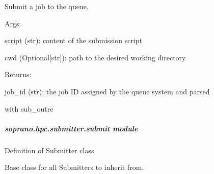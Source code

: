 \documentclass[letterpaper,10pt,english]{sphinxmanual}
\begin{document}
\begin{fulllineitems}
\begin{fulllineitems}
\end{fulllineitems}


\begin{fulllineitems}
\label{doctree/soprano.hpc.submitter.queues:soprano.hpc.submitter.queues.QueueInterface.submit}
Submit a job to the queue.

\begin{DUlineblock}{0em}
\item[] Args:
\item[]
\begin{DUlineblock}{\DUlineblockindent}
\item[] script (str): content of the submission script
\item[] cwd (Optional{[}str{]}): path to the desired working directory
\item[] 
\end{DUlineblock}
\item[] Returns:
\item[]
\begin{DUlineblock}{\DUlineblockindent}
\item[] job\_id (str): the job ID assigned by the queue system and parsed
\item[]
\begin{DUlineblock}{\DUlineblockindent}
\item[] with sub\_outre
\end{DUlineblock}
\end{DUlineblock}
\end{DUlineblock}

\end{fulllineitems}


\end{fulllineitems}



\subparagraph{soprano.hpc.submitter.submit module}
\label{doctree/soprano.hpc.submitter.submit:soprano-hpc-submitter-submit-module}\label{doctree/soprano.hpc.submitter.submit::doc}\label{doctree/soprano.hpc.submitter.submit:module-soprano.hpc.submitter.submit}
Definition of Submitter class

Base class for all Submitters to inherit from.
\end{document}
